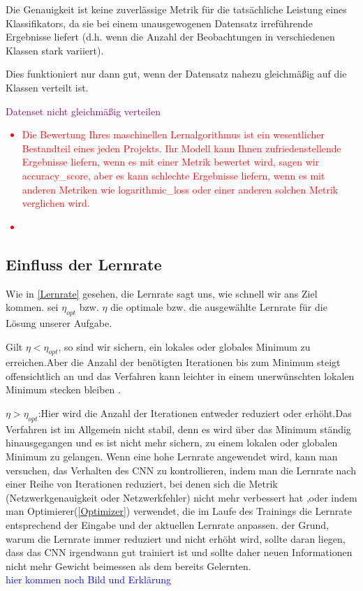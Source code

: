\documentclass[12pt,a4paper]{scrartcl}
\numberwithin{equation}{section}
\begin{document}
 Die Genauigkeit ist keine zuverlässige Metrik für die tatsächliche Leistung eines Klassifikators, da sie bei einem unausgewogenen Datensatz irreführende Ergebnisse liefert (d.h. wenn die Anzahl der Beobachtungen in verschiedenen Klassen stark variiert).

Dies funktioniert nur dann gut, wenn der Datensatz nahezu gleichmäßig auf die Klassen verteilt ist.

\textcolor{purple}{Datenset nicht gleichmäßig verteilen}
\textcolor{red}{\begin{itemize}
		\item Die Bewertung Ihres maschinellen Lernalgorithmus ist ein wesentlicher Bestandteil eines jeden Projekts. Ihr Modell kann Ihnen zufriedenstellende Ergebnisse liefern, wenn es mit einer Metrik bewertet wird, sagen wir accuracy\_score, aber es kann schlechte Ergebnisse liefern, wenn es mit anderen Metriken wie logarithmic\_loss oder einer anderen solchen Metrik verglichen wird.
		\item 
\end{itemize}}
\subsection{ Einfluss der Lernrate}\label{Experiment:Lernrate}
Wie in \ref{Lernrate} gesehen, die Lernrate sagt uns, wie schnell wir ans Ziel kommen.
sei $ \eta_{opt} $  bzw. $ \eta $ die optimale bzw. die ausgewählte Lernrate für die Lösung unserer Aufgabe.

 Gilt {$ \eta < \eta_{opt} $}, so sind wir sichern, ein lokales oder globales Minimum zu erreichen.Aber die Anzahl der benötigten Iterationen bis zum Minimum steigt offensichtlich an und das Verfahren kann leichter in einem unerwünschten lokalen Minimum stecken bleiben .
 
 {$ \eta > \eta_{opt} $}:Hier wird die Anzahl der Iterationen entweder reduziert oder erhöht.Das  Verfahren ist im Allgemein nicht stabil, denn es wird über das Minimum ständig hinausgegangen und es ist nicht mehr sichern, zu einem lokalen oder globalen Minimum zu gelangen.  Wenn eine hohe Lernrate angewendet wird, kann man versuchen, das Verhalten des \ac{CNN} zu kontrollieren, indem man die Lernrate nach einer Reihe von Iterationen reduziert, bei denen sich die Metrik (Netzwerkgenauigkeit oder Netzwerkfehler) nicht mehr verbessert hat ,oder indem man Optimierer(\ref{Optimizer}) verwendet, die im Laufe des Trainings die Lernrate entsprechend der Eingabe und der aktuellen Lernrate anpassen. der Grund, warum die Lernrate immer reduziert und nicht erhöht wird, sollte daran liegen, dass das \ac{CNN} irgendwann gut trainiert ist und sollte daher neuen Informationen nicht mehr Gewicht  beimessen als dem bereits Gelernten. \\
 \textcolor{blue}{ hier kommen noch Bild und Erklärung}
\end{document}

